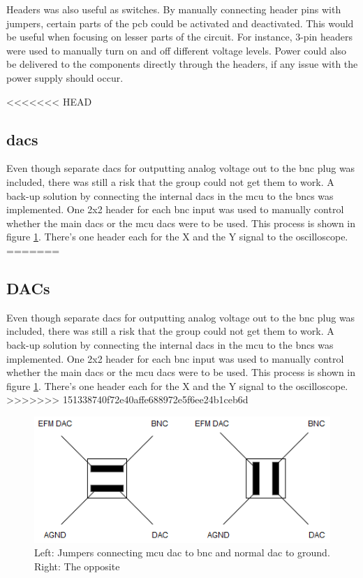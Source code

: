 Headers was also useful as switches.
By manually connecting header pins with jumpers, certain parts of the \gls{pcb} could be activated and deactivated.
This would be useful when focusing on lesser parts of the circuit.
For instance, 3-pin headers were used to manually turn on and off different voltage levels.
Power could also be delivered to the components directly through the headers, if any issue with the power supply should occur.

<<<<<<< HEAD
\subsection{\gls{dac}s}
Even though separate \gls{dac}s for outputting analog voltage out to the \gls{bnc} plug was included, there was still a risk that the group could not get them to work. 
A back-up solution by connecting the internal \gls{dac}s in the \gls{mcu} to the \gls{bnc}s was implemented. 
One 2x2 header for each \gls{bnc} input was used to manually control whether the main \gls{dac}s or the \gls{mcu} \gls{dac}s were to be used. 
This process is shown in figure \ref{fig:DAC headers}. 
There's one header each for the X and the Y signal to the oscilloscope. 
=======
\subsection{DACs}
Even though separate \gls{dac}s for outputting analog voltage out to the \gls{bnc} plug was included, there was still a risk that the group could not get them to work.
A back-up solution by connecting the internal \gls{dac}s in the \gls{mcu} to the \gls{bnc}s was implemented.
One 2x2 header for each \gls{bnc} input was used to manually control whether the main \gls{dac}s or the \gls{mcu} \gls{dac}s were to be used.
This process is shown in figure \ref{fig:DAC headers}.
There's one header each for the X and the Y signal to the oscilloscope.
>>>>>>> 151338740f72e40affe688972e5f6ee24b1ceb6d

\begin{figure}[h!]
\centering
\includegraphics[scale = 0.6]{images/DAC_headers.png}
\caption{Left: Jumpers connecting \gls{mcu} \gls{dac} to \gls{bnc} and normal \gls{dac} to ground. Right: The opposite}
\label{fig:DAC headers}
\end{figure}

